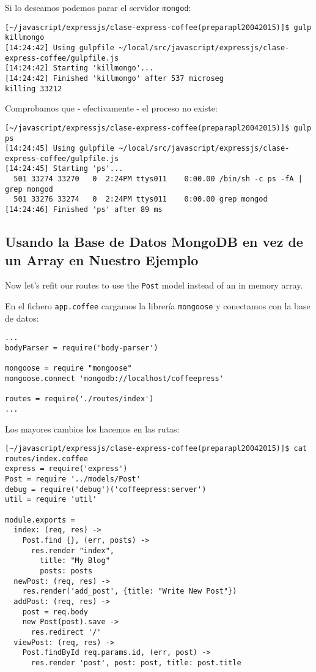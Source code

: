 Si lo deseamos podemos parar el servidor \verb|mongod|:
\begin{verbatim}
[~/javascript/expressjs/clase-express-coffee(preparapl20042015)]$ gulp killmongo
[14:24:42] Using gulpfile ~/local/src/javascript/expressjs/clase-express-coffee/gulpfile.js
[14:24:42] Starting 'killmongo'...
[14:24:42] Finished 'killmongo' after 537 microseg
killing 33212
\end{verbatim}
Comprobamos que - efectivamente - el proceso no existe:
\begin{verbatim}
[~/javascript/expressjs/clase-express-coffee(preparapl20042015)]$ gulp ps
[14:24:45] Using gulpfile ~/local/src/javascript/expressjs/clase-express-coffee/gulpfile.js
[14:24:45] Starting 'ps'...
  501 33274 33270   0  2:24PM ttys011    0:00.00 /bin/sh -c ps -fA | grep mongod
  501 33276 33274   0  2:24PM ttys011    0:00.00 grep mongod
[14:24:46] Finished 'ps' after 89 ms
\end{verbatim}

\subsection{Usando la Base de Datos MongoDB en vez de un Array en Nuestro Ejemplo}

Now let’s refit our routes to use the \verb|Post| 
model instead of an in memory array.

En el fichero \verb|app.coffee| cargamos la librería \verb|mongoose| y conectamos
con la base de datos: 
\begin{verbatim}
...
bodyParser = require('body-parser')

mongoose = require "mongoose"
mongoose.connect 'mongodb://localhost/coffeepress'

routes = require('./routes/index')
...
\end{verbatim}

Los mayores cambios los hacemos en las rutas:
\begin{verbatim}
[~/javascript/expressjs/clase-express-coffee(preparapl20042015)]$ cat routes/index.coffee 
express = require('express')
Post = require '../models/Post'
debug = require('debug')('coffeepress:server')
util = require 'util'

module.exports =
  index: (req, res) ->
    Post.find {}, (err, posts) ->
      res.render "index",
        title: "My Blog"
        posts: posts
  newPost: (req, res) ->
    res.render('add_post', {title: "Write New Post"})
  addPost: (req, res) ->
    post = req.body
    new Post(post).save ->
      res.redirect '/'
  viewPost: (req, res) ->
    Post.findById req.params.id, (err, post) ->
      res.render 'post', post: post, title: post.title
\end{verbatim}

